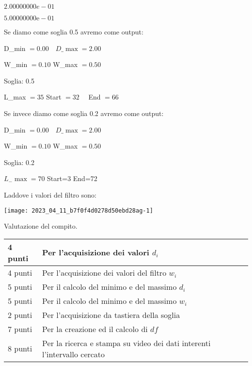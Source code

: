\documentclass[10pt]{article}
\begin{document}
\(2.00000000 e-01\)

\(5.00000000 \mathrm{e}-01\)

Se diamo come soglia 0.5 avremo come output:

D\_min \(=0.00 \quad D \_\max =2.00\)

W\_min \(=0.10\) W\_max \(=0.50\)

Soglia: 0.5

L\_max \(=35\) Start \(=32 \quad\) End \(=66\)

Se invece diamo come soglia 0.2 avremo come output:

D\_min \(=0.00 \quad D \_\max =2.00\)

W\_min \(=0.10\) W\_max \(=0.50\)

Soglia: 0.2

\(L_{-} \max =70\) Start=3 End=72

Laddove i valori del filtro sono:

\begin{center}
\texttt{[image: 2023\_04\_11\_b7f0f4d0278d50ebd28ag-1]}
\end{center}

Valutazione del compito.

\begin{center}
\begin{tabular}{|l|l|}
\hline
4 punti & Per l'acquisizione dei valori \(d_{i}\) \\
\hline
4 punti & Per l'acquisizione dei valori del filtro \(w_{i}\) \\
\hline
5 punti & Per il calcolo del minimo e del massimo \(d_{i}\) \\
\hline
5 punti & Per il calcolo del minimo e del massimo \(w_{i}\) \\
\hline
2 punti & Per l'acquisizione da tastiera della soglia \\
\hline
7 punti & Per la creazione ed il calcolo di \(d f\) \\
\hline
8 punti & Per la ricerca e stampa su video dei dati interenti l'intervallo cercato \\
\hline
\end{tabular}
\end{center}
\end{document}
